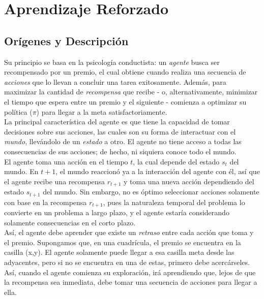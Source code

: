 \chapter{Aprendizaje Reforzado}

\section{Or\'igenes y Descripci\'on}

Su principio se basa en la psicolog\'ia conductista: un \textit{agente} busca ser recompensado por un premio, el cual obtiene cuando realiza una secuencia de \textit{acciones} que lo llevan a concluir una tarea exitosamente. Adem\'as, para maximizar la cantidad de \textit{recompensa} que recibe - o, alternativamente, minimizar el tiempo que espera entre un premio y el siguiente - comienza a optimizar su pol\'itica (\textit{$\pi$}) para llegar a la meta satisfactoriamente.\\

La principal caracter\'istica del agente es que tiene la capacidad de tomar decisiones sobre sus acciones, las cuales son su forma de interactuar con el \textit{mundo}, llev\'andolo de un \textit{estado} a otro. El agente no tiene acceso a todas las consecuencias de sus acciones; de hecho, ni siquiera conoce todo el mundo.\\

El agente toma una acci\'on en el tiempo $t$, la cual depende del estado $s_t$ del mundo. En $t+1$, el mundo reaccion\'o ya a la interacci\'on del agente con \'el, as\'i que el agente recibe una recompensa $r_{t+1}$ y toma una nueva acci\'on dependiendo del estado $s_{t+1}$ del mundo. Sin embargo, no es \'optimo seleccionar acciones solamente con base en la recompensa $r_{t+1}$, pues la naturaleza temporal del problema lo convierte en un problema a largo plazo, y el agente estar\'ia considerando solamente consecuencias en el corto plazo.\\

As\'i, el agente debe aprender que existe un \textit{retraso} entre cada acci\'on que toma y el premio. Supongamos que, en una cuadr\'icula, el premio se encuentra en la casilla (x,y). El agente solamente puede llegar a esa casilla meta desde las adyacentes, pero si no se encuentra en una de estas, primero debe acerc\'arseles. As\'i, cuando el agente comienza su exploraci\'on, ir\'a aprendiendo que, lejos de que la recompensa sea inmediata, debe tomar una secuencia de acciones para llegar a ella.\\

